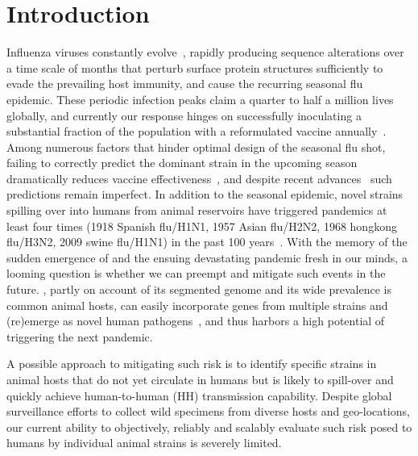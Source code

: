 \documentclass[onecolumn, compsoc,10pt]{IEEEtran}
\begin{document}
\vspace{10pt}
\section*{Introduction}
Influenza viruses constantly evolve~\cite{dos2016influenza},  rapidly producing  sequence alterations over a time scale of months  that  perturb surface protein structures sufficiently to evade the prevailing host immunity, and cause the  recurring seasonal flu epidemic. These periodic  infection peaks claim a quarter to half a million lives~\cite{huddleston2020integrating} globally,  and currently our response hinges on  successfully inoculating a substantial fraction of the  population with a  reformulated  vaccine annually~\cite{boni2008vaccination,dos2016influenza}.  Among numerous factors that hinder optimal design of the seasonal flu shot, failing to correctly predict the dominant strain in the upcoming season dramatically reduces vaccine effectiveness~\cite{tricco2013comparing}, and despite  recent advances~\cite{neher2014predicting,huddleston2020integrating} such predictions remain imperfect. In addition to  the seasonal  epidemic, novel \infl strains spilling over into humans from animal reservoirs have triggered  pandemics  at least four times (1918 Spanish flu/H1N1, 1957 Asian flu/H2N2, 1968 hongkong flu/H3N2, 2009 swine flu/H1N1) in the past 100 years~\cite{shao2017evolution}. With the memory of the  sudden emergence of \cov and the ensuing devastating pandemic fresh in our minds, a looming question  is whether we can  preempt and mitigate such events in the future.  \infl,  partly on account of its segmented genome and its wide prevalence is common animal hosts, can easily incorporate genes from multiple strains and (re)emerge as novel human pathogens~\cite{reid2003origin,vergara2014ns}, and   thus harbors  a high potential  of triggering the next  pandemic.



A possible approach to mitigating such risk is to identify specific strains in animal hosts that do not yet circulate in humans but is likely to spill-over and quickly achieve human-to-human (HH) transmission capability. Despite global surveillance efforts to  collect wild specimens from diverse hosts and geo-locations, our  current ability to objectively, reliably and scalably  evaluate such risk posed to  humans by  individual animal  strains  is severely limited.
\end{document}

